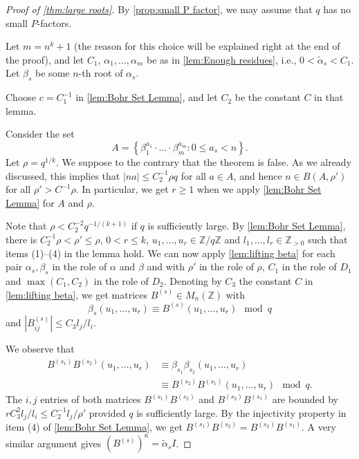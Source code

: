 \documentclass[12pt, a4paper]{amsart}
\numberwithin{equation}{section}
\theoremstyle{definition}
\newcommand{\Z}{\mathbb{Z}}
\newcommand{\wt}{\widetilde}
\begin{document}
\begin{proof}[Proof of \cref{thm:large roots}]
By \cref{prop:small P factor}, we may assume that $q$ has no small $P$-factors. 
	
Let $m=n^{k}+1$ (the reason for this choice will be explained right at the end of the proof), and let $C_1$,
$\alpha_{1},\ldots,\alpha_{m}$ be as in \cref{lem:Enough residues}, i.e., $0<\wt\alpha_{s}<C_1$. Let $\beta_{s}$ be some $n$-th root of $\alpha_{s}$. 

Choose $c=C_1^{-1}$ in \cref{lem:Bohr Set Lemma}, and let $C_2$ be the constant
$C$ in that lemma.
	
Consider the set 
\[
A=\left\{ \beta_{1}^{a_{1}}\cdot\ldots\cdot\beta_{m}^{a_{m}}:0\le a_{s}<n\right\} .
\]
Let $\rho=q^{1/k}$. 
We suppose to the contrary that the theorem is false.
As we already discussed, this implies that $\lvert n a\rvert \le C_2^{-1}\rho q$ for all $a\in A$,
and hence $n\in B(A,\rho')$ for all $\rho'>C^{-1}\rho$.
In particular, we get $r\ge 1$ when we apply \cref{lem:Bohr Set Lemma}
for $A$ and $\rho$.


Note that $\rho<C_2^{-2}q^{-1/(k+1)}$ if $q$ is sufficiently large.
By \cref{lem:Bohr Set Lemma}, there is $C_2^{-1}\rho<\rho'\le\rho$, $0<r\le k$,
$u_{1},\ldots,u_{r}\in \Z/q\Z$ and $l_{1},\ldots,l_{r}\in \Z_{>0}$ such that 
items (1)--(4) in the lemma hold.
We can now apply \cref{lem:lifting beta} for each pair $\alpha_s, \beta_s$ in the
role of $\alpha$ and $\beta$ and with $\rho'$ in the role of $\rho$, $C_1$ in the role of $D_1$
and $\max(C_1,C_2)$
in the role of $D_2$.
Denoting by $C_3$ the constant $C$ in \cref{lem:lifting beta}, we get
matrices $B^{(s)} \in M_n(\Z)$ with
\[
\beta_s(u_1,\ldots, u_r)\equiv B^{(s)}(u_1,\ldots, u_r) \mod q
\]
and $|B^{(s)}_{ij}|\le C_3l_j/l_i$.

We observe that
\begin{align*}
B^{(s_1)}B^{(s_2)}(u_1,\ldots, u_r)&\equiv\beta_{s_1}\beta_{s_2}(u_1,\ldots, u_r) \\
&\equiv B^{(s_2)}B^{(s_1)}(u_1,\ldots, u_r) \mod q.    
\end{align*}
The $i,j$ entries of both matrices $B^{(s_1)}B^{(s_2)}$ and $B^{(s_2)}B^{(s_1)}$
are bounded by $rC_3^2l_j/l_i\le C_2^{-1} l_j/\rho'$ provided $q$ is sufficiently large.
By the injectivity property in item (4) of \cref{lem:Bohr Set Lemma},
we get $B^{(s_1)}B^{(s_2)}=B^{(s_2)}B^{(s_1)}$.
A very similar argument gives $(B^{(s)})^n=\wt\alpha_sI$.


\end{proof}
\end{document}
